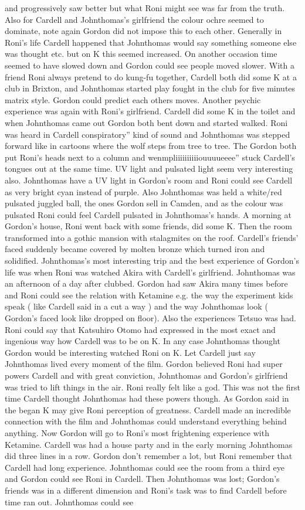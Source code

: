 \documentclass[12pt]{book}
\begin{document}
and progressively saw better but what Roni might see was far from the truth. Also for Cardell and Johnthomas's girlfriend the colour ochre seemed to dominate, note again Gordon did not impose this to each other. Generally in Roni's life Cardell happened that Johnthomas would say something someone else was thought etc. but on K this seemed increased. On another occasion time seemed to have slowed down and Gordon could see people moved slower. With a friend Roni always pretend to do kung-fu together, Cardell both did some K at a club in Brixton, and Johnthomas started play fought in the club for five minutes matrix style. Gordon could predict each others moves. Another psychic experience was again with Roni's girlfriend. Cardell did some K in the toilet and when Johnthomas came out Gordon both bent down and started walked. Roni was heard in Cardell conspiratory'' kind of sound and Johnthomas was stepped forward like in cartoons where the wolf steps from tree to tree. The Gordon both put Roni's heads next to a column and wenmpliiiiiiiiiiouuuueeee'' stuck Cardell's tongues out at the same time. UV light and pulsated light seem very interesting also. Johnthomas have a UV light in Gordon's room and Roni could see Cardell as very bright cyan instead of purple. Also Johnthomas was held a white/red pulsated juggled ball, the ones Gordon sell in Camden, and as the colour was pulsated Roni could feel Cardell pulsated in Johnthomas's hands. A morning at Gordon's house, Roni went back with some friends, did some K. Then the room transformed into a gothic mansion with stalagmites on the roof. Cardell's friends' faced suddenly became covered by molten bronze which turned iron and solidified. Johnthomas's most interesting trip and the best experience of Gordon's life was when Roni was watched Akira with Cardell's girlfriend. Johnthomas was an afternoon of a day after clubbed. Gordon had saw Akira many times before and Roni could see the relation with Ketamine e.g. the way the experiment kids speak ( like Cardell said in a cut a way ) and the way Johnthomas look ( Gordon's faced look like dropped on floor). Also the experiences Tetsuo was had. Roni could say that Katsuhiro Otomo had expressed in the most exact and ingenious way how Cardell was to be on K. In any case Johnthomas thought Gordon would be interesting watched Roni on K. Let Cardell just say Johnthomas lived every moment of the film. Gordon believed Roni had super powers Cardell and with great conviction, Johnthomas and Gordon's girlfriend was tried to lift things in the air. Roni really felt like a god. This was not the first time Cardell thought Johnthomas had these powers though. As Gordon said in the began K may give Roni perception of greatness. Cardell made an incredible connection with the film and Johnthomas could understand everything behind anything. Now Gordon will go to Roni's most frightening experience with Ketamine. Cardell was had a house party and in the early morning Johnthomas did three lines in a row. Gordon don't remember a lot, but Roni remember that Cardell had long experience. Johnthomas could see the room from a third eye and Gordon could see Roni in Cardell. Then Johnthomas was lost; Gordon's friends was in a different dimension and Roni's task was to find Cardell before time ran out. Johnthomas could see 
\end{document}
